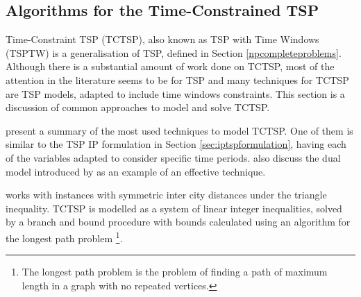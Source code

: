 \documentclass{mprop}
\theoremstyle{definition}
\begin{document}
\subsection{Algorithms for the Time-Constrained TSP}
\label{sec:tctspalgos}
Time-Constraint TSP (TCTSP), also known as TSP with Time Windows (TSPTW) is a generalisation of TSP, defined in Section \ref{npcompleteproblems}.
Although there is a substantial amount of work done on TCTSP, most of the attention in the literature seems to be for TSP \citep{tspbible} and many techniques for TCTSP are TSP models, adapted to include time windows constraints. This section is a discussion of common approaches to model and solve TCTSP.

\citet{tspbible} present a summary of the most used techniques to model TCTSP. One of them is similar to the TSP IP formulation in Section \ref{sec:iptspformulation}, having each of the variables adapted to consider specific time periods. \citet{tspbible} also discuss the dual model introduced by \citet{Baker83} as an example of an effective technique.

\citet{Baker83} works with instances with symmetric inter city distances under the triangle inequality. TCTSP is modelled as a system of linear integer inequalities, solved by a branch and bound procedure with bounds calculated using an algorithm for the longest path problem \footnote{The longest path problem is the problem of finding a path of maximum length in a graph with no repeated vertices.}.


\end{document}
